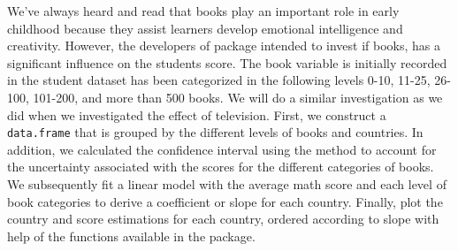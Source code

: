 We've always heard and read that books play an important role in early
childhood because they assist learners develop emotional intelligence
and creativity. However, the developers of 
package intended to invest if books, has a significant influence on the
students score. The book variable is initially recorded in the student
dataset has been categorized in the following levels 0-10, 11-25,
26-100, 101-200, and more than 500 books. We will do a similar
investigation as we did when we investigated the effect of television.
First, we construct a \texttt{data.frame} that is grouped by the
different levels of books and countries. In addition, we calculated the
confidence interval using the method to account for the uncertainty
associated with the scores for the different categories of books. We
subsequently fit a linear model with the average math score and each
level of book categories to derive a coefficient or slope for each
country. Finally, plot the country and score estimations for each
country, ordered according to slope with help of the functions available
in the  \citep{ggplot2} package.


